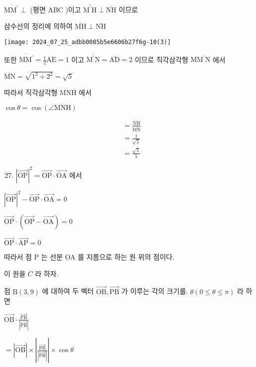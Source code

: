 \documentclass[10pt]{article}
\begin{document}
$\overline{\mathrm{MM}^{\prime}} \perp$ (평면 ABC )이고 $\overline{\mathrm{M}^{\prime} \mathrm{H}} \perp \overline{\mathrm{NH}}$ 이므로

삼수선의 정리에 의하여 $\overline{\mathrm{MH}} \perp \overline{\mathrm{NH}}$

\begin{center}
\texttt{[image: 2024\_07\_25\_adbb0085b5e6606b27f6g-10(3)]}
\end{center}

또한 $\overline{\mathrm{MM}^{\prime}}=\frac{1}{2} \overline{\mathrm{AE}}=1$ 이고 $\overline{\mathrm{M}^{\prime} \mathrm{N}}=\overline{\mathrm{AD}}=2$ 이므로 직각삼각형 $\mathrm{MM}^{\prime} \mathrm{N}$ 에서

$\overline{\mathrm{MN}}=\sqrt{1^{2}+2^{2}}=\sqrt{5}$

따라서 직각삼각형 MNH 에서

$\cos \theta=\cos (\angle \mathrm{MNH})$

\[
\begin{aligned}
& =\frac{\overline{\mathrm{NH}}}{\overline{\mathrm{MN}}} \\
& =\frac{1}{\sqrt{5}} \\
& =\frac{\sqrt{5}}{5}
\end{aligned}
\]

\begin{enumerate}
  \setcounter{enumi}{26}
  \item $|\overrightarrow{\mathrm{OP}}|^{2}=\overrightarrow{\mathrm{OP}} \cdot \overrightarrow{\mathrm{OA}}$ 에서
\end{enumerate}

$|\overrightarrow{\mathrm{OP}}|^{2}-\overrightarrow{\mathrm{OP}} \cdot \overrightarrow{\mathrm{OA}}=0$

$\overrightarrow{\mathrm{OP}} \cdot(\overrightarrow{\mathrm{OP}}-\overrightarrow{\mathrm{OA}})=0$

$\overrightarrow{\mathrm{OP}} \cdot \overrightarrow{\mathrm{AP}}=0$

따라서 점 P 는 선분 OA 를 지름으로 하는 원 위의 점이다.

이 원을 $C$ 라 하자.

점 $\mathrm{B}(3,9)$ 에 대하여 두 벡터 $\overrightarrow{\mathrm{OB}}, \overrightarrow{\mathrm{PB}}$ 가 이루는 각의 크기를. $\theta(0 \leq \theta \leq \pi)$ 라 하면

$\overrightarrow{\mathrm{OB}} \cdot \frac{\overrightarrow{\mathrm{PB}}}{|\overrightarrow{\mathrm{PB}}|}$

$=|\overrightarrow{\mathrm{OB}}| \times\left|\frac{\overrightarrow{\mathrm{PB}}}{|\overrightarrow{\mathrm{PB}}|}\right| \times \cos \theta$
\end{document}
